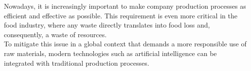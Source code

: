 
Nowadays, it is increasingly important to make company production processes as efficient and effective as possible.
This requirement is even more critical in the food industry, where any waste directly translates into food loss and, consequently, a waste of resources.\\
To mitigate this issue in a global context that demands a more responsible use of raw materials, modern technologies such as artificial intelligence can be integrated with traditional production processes.
